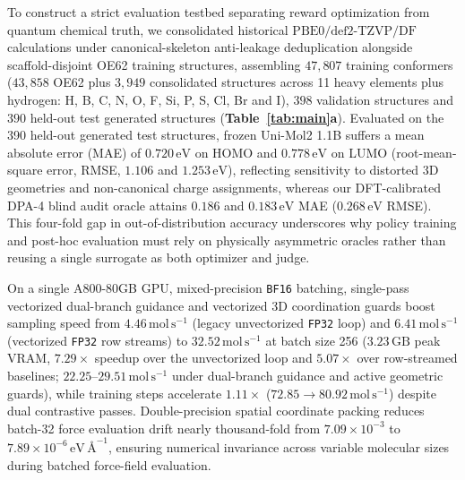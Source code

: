\documentclass[11pt,a4paper]{article}
\begin{document}
To construct a strict evaluation testbed separating reward optimization from quantum chemical truth, we consolidated historical $\text{PBE0/def2-TZVP/DF}$ calculations under canonical-skeleton anti-leakage deduplication alongside scaffold-disjoint OE62 training structures\cite{stuke2020oe62}, assembling $47{,}807$ training conformers ($43{,}858$ OE62 plus $3{,}949$ consolidated structures across 11 heavy elements plus hydrogen: H, B, C, N, O, F, Si, P, S, Cl, Br and I), $398$ validation structures and $390$ held-out test generated structures (\textbf{Table~\ref{tab:main}a}). Evaluated on the 390 held-out generated test structures, frozen Uni-Mol2 1.1B\cite{ji2024unimol2} suffers a mean absolute error (MAE) of $0.720\,\text{eV}$ on HOMO and $0.778\,\text{eV}$ on LUMO (root-mean-square error, RMSE, $1.106$ and $1.253\,\text{eV}$), reflecting sensitivity to distorted 3D geometries and non-canonical charge assignments, whereas our DFT-calibrated DPA-4 blind audit oracle attains $0.186$ and $0.183\,\text{eV}$ MAE ($0.268\,\text{eV}$ RMSE). This four-fold gap in out-of-distribution accuracy underscores why policy training and post-hoc evaluation must rely on physically asymmetric oracles rather than reusing a single surrogate as both optimizer and judge.

On a single A800-80GB GPU, mixed-precision \texttt{BF16} batching, single-pass vectorized dual-branch guidance and vectorized 3D coordination guards boost sampling speed from $4.46\,\text{mol}\,\text{s}^{-1}$ (legacy unvectorized \texttt{FP32} loop) and $6.41\,\text{mol}\,\text{s}^{-1}$ (vectorized \texttt{FP32} row streams) to $32.52\,\text{mol}\,\text{s}^{-1}$ at batch size 256 ($3.23\,\text{GB}$ peak VRAM, $7.29\times$ speedup over the unvectorized loop and $5.07\times$ over row-streamed baselines; $22.25$--$29.51\,\text{mol}\,\text{s}^{-1}$ under dual-branch guidance and active geometric guards), while training steps accelerate $1.11\times$ ($72.85 \to 80.92\,\text{mol}\,\text{s}^{-1}$) despite dual contrastive passes. Double-precision spatial coordinate packing reduces batch-32 force evaluation drift nearly thousand-fold from $7.09\times 10^{-3}$ to $7.89\times 10^{-6}\,\text{eV}\,\text{\AA}^{-1}$, ensuring numerical invariance across variable molecular sizes during batched force-field evaluation.
\end{document}
